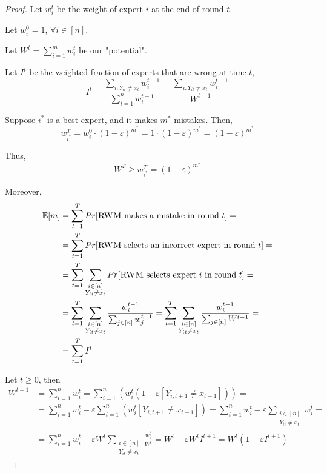     \begin{proof}
        Let $w_i^t$ be the weight of expert $i$ at the end of round $t$.

        Let $w_i^0 = 1$, $\forall i \in [n]$.

        Let $W^t = \sum_{i=1}^{m} w_i^t$ be our "potential".

        Let $I^t$ be the weighted fraction of experts that are wrong at time $t$,
        \[ I^t = \frac{\sum_{i : Y_{it} \neq x_t} w_i^{t-1}}{\sum_{i=1}^{n} w_i^{t-1}} = \frac{\sum_{i : Y_{it} \neq x_t} w_i^{t-1}}{W^{t-1}} \]

        Suppose $i^*$ is a best expert, and it makes $m^*$ mistakes.
        Then,
        \[ w_{i^*}^T = w_i^0 \cdot (1 - \varepsilon)^{m^*} = 1 \cdot (1 - \varepsilon)^{m^*} = (1 - \varepsilon)^{m^*} \]

        Thus,
        \[ W^T \geq w_{i^*}^T = (1 - \varepsilon)^{m^*} \]

        Moreover,
        \begin{equation*}
            \begin{split}
                \mathbb{E}[m] &= \sum_{t=1}^{T} Pr[\text{\textsc{RWM} makes a mistake in round } t] =\\
                    &= \sum_{t=1}^{T} Pr[\text{\textsc{RWM} selects an incorrect expert in round } t] =\\
                    &= \sum_{t=1}^{T} \sum_{\substack{i \in [n] \\ Y_{it} \neq x_t}} Pr[\text{\textsc{RWM} selects expert } i \text{ in round } t] =\\
                    &= \sum_{t=1}^{T} \sum_{\substack{i \in [n] \\ Y_{it} \neq x_t}} \frac{w_i^{t-1}}{\sum_{j \in [n]} w_j^{t-1}} = \sum_{t=1}^{T} \sum_{\substack{i \in [n] \\ Y_{it} \neq x_t}} \frac{w_i^{t-1}}{\sum_{j \in [n]} W^{t-1}} =\\
                    &= \sum_{t=1}^{T} I^t
            \end{split}
        \end{equation*}

        Let $t \geq 0$, then
        \begin{equation*}
            \begin{split}
                W^{t+1} &= \sum_{i=1}^{n} w_i^t = \sum_{i=1}^{n}(w_i^t (1 - \varepsilon [Y_{i, t+1} \neq x_{t+1}])) =\\
                    &= \sum_{i=1}^{n} w_i^t - \varepsilon \sum_{i=1}^{n} (w_i^t [Y_{i, t+1} \neq x_{t+1}]) = \sum_{i=1}^{n} w_i^t - \varepsilon \sum_{\substack{i \in [n] \\ Y_{it} \neq x_t}} w_i^t =\\
                    &= \sum_{i=1}^{n} w_i^t - \varepsilon W^t \sum_{\substack{i \in [n] \\ Y_{it} \neq x_t}} \frac{w_i^t}{W^t} = W^t - \varepsilon W^t I^{t+1} = W^t (1 - \varepsilon I^{t+1})
            \end{split}
        \end{equation*}


\end{proof}
